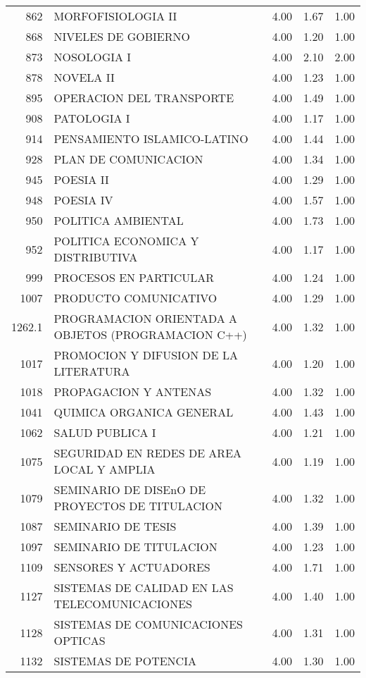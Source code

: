 \documentclass[12pt]{article}
\begin{document}
\begin{table}[ht]
\begin{tabular}{rlrrr}
  862 & MORFOFISIOLOGIA II & 4.00 & 1.67 & 1.00 \\ 
  868 & NIVELES DE GOBIERNO & 4.00 & 1.20 & 1.00 \\ 
  873 & NOSOLOGIA I & 4.00 & 2.10 & 2.00 \\ 
  878 & NOVELA II & 4.00 & 1.23 & 1.00 \\ 
  895 & OPERACION DEL TRANSPORTE & 4.00 & 1.49 & 1.00 \\ 
  908 & PATOLOGIA I & 4.00 & 1.17 & 1.00 \\ 
  914 & PENSAMIENTO ISLAMICO-LATINO & 4.00 & 1.44 & 1.00 \\ 
  928 & PLAN DE COMUNICACION & 4.00 & 1.34 & 1.00 \\ 
  945 & POESIA II & 4.00 & 1.29 & 1.00 \\ 
  948 & POESIA IV & 4.00 & 1.57 & 1.00 \\ 
  950 & POLITICA AMBIENTAL & 4.00 & 1.73 & 1.00 \\ 
  952 & POLITICA ECONOMICA Y DISTRIBUTIVA & 4.00 & 1.17 & 1.00 \\ 
  999 & PROCESOS EN PARTICULAR & 4.00 & 1.24 & 1.00 \\ 
  1007 & PRODUCTO COMUNICATIVO & 4.00 & 1.29 & 1.00 \\ 
  1262.1 & PROGRAMACION ORIENTADA A OBJETOS (PROGRAMACION C++) & 4.00 & 1.32 & 1.00 \\ 
  1017 & PROMOCION Y DIFUSION DE LA LITERATURA & 4.00 & 1.20 & 1.00 \\ 
  1018 & PROPAGACION Y ANTENAS & 4.00 & 1.32 & 1.00 \\ 
  1041 & QUIMICA ORGANICA GENERAL & 4.00 & 1.43 & 1.00 \\ 
  1062 & SALUD PUBLICA I & 4.00 & 1.21 & 1.00 \\ 
  1075 & SEGURIDAD EN REDES DE AREA LOCAL Y AMPLIA & 4.00 & 1.19 & 1.00 \\ 
  1079 & SEMINARIO DE DISEnO DE PROYECTOS DE TITULACION & 4.00 & 1.32 & 1.00 \\ 
  1087 & SEMINARIO DE TESIS & 4.00 & 1.39 & 1.00 \\ 
  1097 & SEMINARIO DE TITULACION & 4.00 & 1.23 & 1.00 \\ 
  1109 & SENSORES Y ACTUADORES & 4.00 & 1.71 & 1.00 \\ 
  1127 & SISTEMAS DE CALIDAD EN LAS TELECOMUNICACIONES & 4.00 & 1.40 & 1.00 \\ 
  1128 & SISTEMAS DE COMUNICACIONES OPTICAS & 4.00 & 1.31 & 1.00 \\ 
  1132 & SISTEMAS DE POTENCIA & 4.00 & 1.30 & 1.00 \\ 

\end{tabular}
\end{table}
\end{document}
